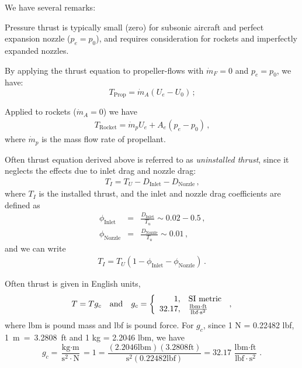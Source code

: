 We have several remarks:
\begin{itemizePacked}
  \item Pressure thrust is typically small (zero) for subsonic aircraft and perfect expansion nozzle ($p_e = p_0$), and requires consideration for rockets and imperfectly expanded nozzles.
  \item By applying the thrust equation to propeller-flows with $\dot{m}_{F}=0$ and $p_e = p_0$, we have:
    \begin{equation}
      T_{\text{Prop}} = \dot{m}_A(U_e - U_0) \, \text{;}
    \end{equation}
  \item Applied to rockets ($\dot{m}_A = 0$) we have
   \begin{eqnarray}
     T_{\text{Rocket}} = \dot{m}_p U_e + {A_e\left(p_e - p_0\right)} \, \text{,}
   \end{eqnarray}
   where $\dot{m}_p$ is the mass flow rate of propellant.
  \item Often thrust equation derived above is referred to as {\it uninstalled thrust}, since it neglects the effects due to inlet drag and nozzle drag:
  \begin{eqnarray}
     T_I = T_U - D_{\text{Inlet}} - D_{\text{Nozzle}} \, \text{,}
  \end{eqnarray}
  where $T_I$ is the installed thrust, and the inlet and nozzle drag coefficients are defined as
  \begin{eqnarray}
     \phi_\text{Inlet} &=& \frac{D_\text{Inlet}}{T_u} \sim 0.02-0.5 \, \text{,}\\
     \phi_\text{Nozzle} &=& \frac{D_\text{Nozzle}}{T_u} \sim 0.01 \, \text{,}
  \end{eqnarray}
  and we can write
    \begin{eqnarray}
     T_I = T_U (1- \phi_{\text{Inlet}} - \phi_{\text{Nozzle}}) \, \text{.}
  \end{eqnarray} 
  \item Often thrust is given in English units,
    \begin{equation}
    T = T g_c \quad \text{and} \quad g_c = \left\{ 
         \begin{array}{r@{,\quad}l}
          1 & {\text{SI metric}}\\
          32.17 & {\frac{\text{lbm}\cdot\text{ft}}{\text{lbf}\cdot\text{s}^2}}\\
         \end{array}
         \right. \, \text{,}
    \end{equation}
    where lbm is pound mass and lbf is pound force. For $g_c$, since 1 N = 0.22482 lbf, 1~m~=~3.2808~ft and 1 kg = 2.2046 lbm, we have
    \begin{equation}
    g_c = \frac{\text{kg}\cdot\text{m}}{\text{s}^2\cdot\text{N}} = 1 = \frac{(2.2046\text{lbm})(3.2808\text{ft})}{\text{s}^2(0.22482\text{lbf})} = 32.17\, \frac{\text{lbm}\cdot\text{ft}}{\text{lbf}\cdot\text{s}^2} \, .
    \end{equation}
\end{itemizePacked}

